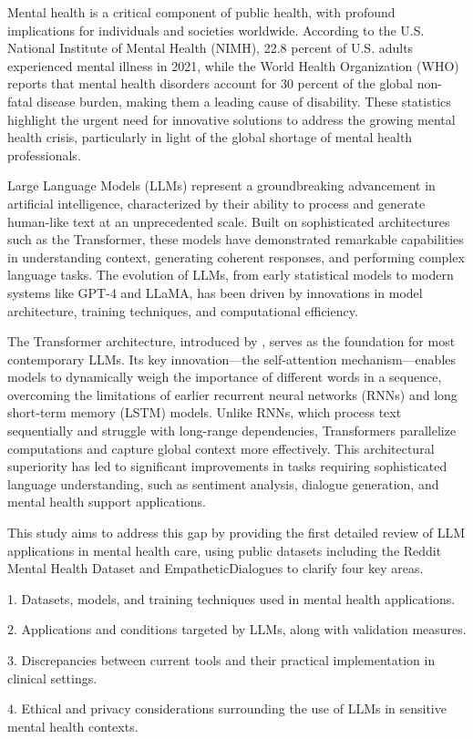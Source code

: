 Mental health is a critical component of public health, with profound implications for individuals and societies worldwide. According to the U.S. National Institute of Mental Health (NIMH), 22.8 percent of U.S. adults experienced mental illness in 2021, while the World Health Organization (WHO) reports that mental health disorders account for 30 percent of the global non-fatal disease burden, making them a leading cause of disability. These statistics highlight the urgent need for innovative solutions to address the growing mental health crisis, particularly in light of the global shortage of mental health professionals.

Large Language Models (LLMs) represent a groundbreaking advancement in artificial intelligence, characterized by their ability to process and generate human-like text at an unprecedented scale. Built on sophisticated architectures such as the Transformer, these models have demonstrated remarkable capabilities in understanding context, generating coherent responses, and performing complex language tasks. The evolution of LLMs, from early statistical models to modern systems like GPT-4 and LLaMA, has been driven by innovations in model architecture, training techniques, and computational efficiency.

The Transformer architecture, introduced by \cite{Vaswani2017}, serves as the foundation for most contemporary LLMs. Its key innovation—the self-attention mechanism—enables models to dynamically weigh the importance of different words in a sequence, overcoming the limitations of earlier recurrent neural networks (RNNs) and long short-term memory (LSTM) models. Unlike RNNs, which process text sequentially and struggle with long-range dependencies, Transformers parallelize computations and capture global context more effectively. This architectural superiority has led to significant improvements in tasks requiring sophisticated language understanding, such as sentiment analysis, dialogue generation, and mental health support applications.

This study aims to address this gap by providing the first detailed review of LLM applications in mental health care, using public datasets including the Reddit Mental Health Dataset \cite{low2020natural} and EmpatheticDialogues \cite{rashkin2019empathetic} to clarify four key areas.

1. Datasets, models, and training techniques used in mental health applications.

2. Applications and conditions targeted by LLMs, along with validation measures.

3. Discrepancies between current tools and their practical implementation in clinical settings.

4. Ethical and privacy considerations surrounding the use of LLMs in sensitive mental health contexts.